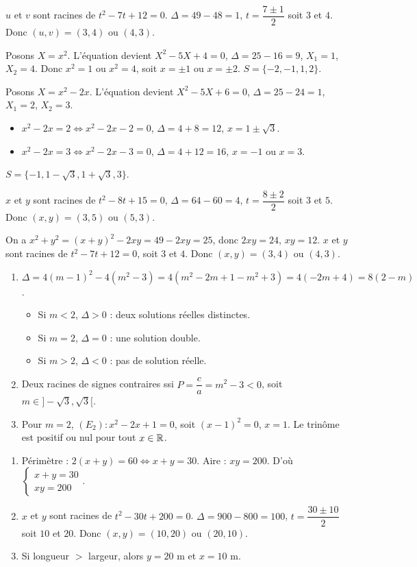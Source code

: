 $u$ et $v$ sont racines de $t^2 - 7t + 12 = 0$. $\Delta = 49 - 48 = 1$, $t = \dfrac{7 \pm 1}{2}$ soit $3$ et $4$. Donc $(u,v) = (3,4)$ ou $(4,3)$.

Posons $X = x^2$. L'équation devient $X^2 - 5X + 4 = 0$, $\Delta = 25 - 16 = 9$, $X_1 = 1$, $X_2 = 4$. Donc $x^2 = 1$ ou $x^2 = 4$, soit $x = \pm 1$ ou $x = \pm 2$. $S = \{-2, -1, 1, 2\}$.

Posons $X = x^2 - 2x$. L'équation devient $X^2 - 5X + 6 = 0$, $\Delta = 25 - 24 = 1$, $X_1 = 2$, $X_2 = 3$.
\begin{itemize}
  \item $x^2 - 2x = 2 \iff x^2 - 2x - 2 = 0$, $\Delta = 4 + 8 = 12$, $x = 1 \pm \sqrt{3}$.
  \item $x^2 - 2x = 3 \iff x^2 - 2x - 3 = 0$, $\Delta = 4 + 12 = 16$, $x = -1$ ou $x = 3$.
\end{itemize}
$S = \{-1, 1-\sqrt{3}, 1+\sqrt{3}, 3\}$.

$x$ et $y$ sont racines de $t^2 - 8t + 15 = 0$, $\Delta = 64 - 60 = 4$, $t = \dfrac{8 \pm 2}{2}$ soit $3$ et $5$. Donc $(x,y) = (3,5)$ ou $(5,3)$.

On a $x^2 + y^2 = (x+y)^2 - 2xy = 49 - 2xy = 25$, donc $2xy = 24$, $xy = 12$. $x$ et $y$ sont racines de $t^2 - 7t + 12 = 0$, soit $3$ et $4$. Donc $(x,y) = (3,4)$ ou $(4,3)$.

\begin{enumerate}[label=\arabic*)]
  \item $\Delta = 4(m-1)^2 - 4(m^2-3) = 4(m^2 - 2m + 1 - m^2 + 3) = 4(-2m + 4) = 8(2 - m)$. 
  \begin{itemize}
    \item Si $m < 2$, $\Delta > 0$ : deux solutions réelles distinctes.
    \item Si $m = 2$, $\Delta = 0$ : une solution double.
    \item Si $m > 2$, $\Delta < 0$ : pas de solution réelle.
  \end{itemize}
  \item Deux racines de signes contraires ssi $P = \dfrac{c}{a} = m^2 - 3 < 0$, soit $m \in ]-\sqrt{3}, \sqrt{3}[$.
  \item Pour $m=2$, $(E_2) : x^2 - 2x + 1 = 0$, soit $(x-1)^2 = 0$, $x=1$. Le trinôme est positif ou nul pour tout $x \in \mathbb{R}$.
\end{enumerate}

\begin{enumerate}[label=\arabic*)]
  \item Périmètre : $2(x+y) = 60 \iff x+y = 30$. Aire : $xy = 200$. D'où $\begin{cases} x+y = 30 \\ xy = 200 \end{cases}$.
  \item $x$ et $y$ sont racines de $t^2 - 30t + 200 = 0$. $\Delta = 900 - 800 = 100$, $t = \dfrac{30 \pm 10}{2}$ soit $10$ et $20$. Donc $(x,y) = (10,20)$ ou $(20,10)$.
  \item Si longueur $>$ largeur, alors $y = 20$ m et $x = 10$ m.
\end{enumerate}

